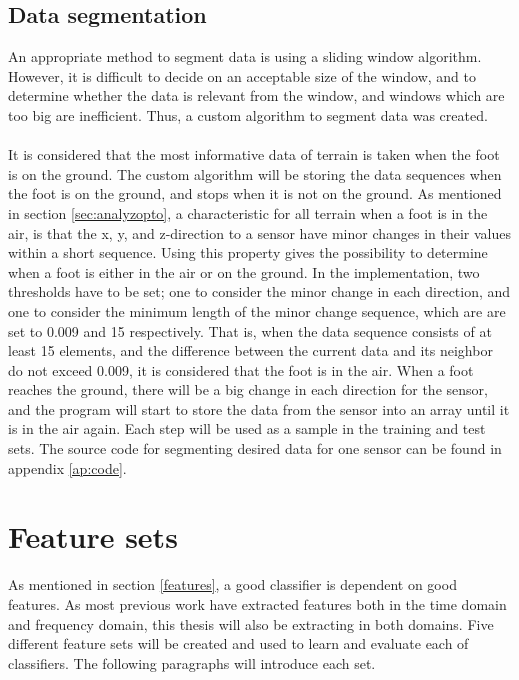 \documentclass[USenglish]{ifimaster}  %
\begin{document}
\subsection{Data segmentation} \label{subseq:segmentation}
An appropriate method to segment data is using a sliding window algorithm. However, it is difficult to decide on an acceptable size of the window, and to determine whether the data is relevant from the window, and windows which are too big are inefficient. Thus, a custom algorithm to segment data was created. 
\\
\\
It is considered that the most informative data of terrain is taken when the foot is on the ground. The custom algorithm will be storing the data sequences when the foot is on the ground, and stops when it is not on the ground. As mentioned in section \ref{sec:analyzopto}, a characteristic for all terrain when a foot is in the air, is that the x, y, and z-direction to a sensor have minor changes in their values within a short sequence. Using this property gives the possibility to determine when a foot is either in the air or on the ground. In the implementation, two thresholds have to be set; one to consider the minor change in each direction, and one to consider the minimum length of the minor change sequence, which are are set to 0.009 and 15 respectively. That is, when the data sequence consists of at least 15 elements, and the difference between the current data and its neighbor do not exceed 0.009, it is considered that the foot is in the air. When a foot reaches the ground, there will be a big change in each direction for the sensor, and the program will start to store the data from the sensor into an array until it is in the air again. Each step will be used as a sample in the training and test sets. The source code for segmenting desired data for one sensor can be found in appendix \ref{ap:code}.

\section{Feature sets}\label{sec:featuresets}
As mentioned in section \ref{features}, a good classifier is dependent on good features. As most previous work have extracted features both in the time domain and frequency domain, this thesis will also be extracting in both domains. Five different feature sets will be created and used to learn and evaluate each of classifiers. The following paragraphs will introduce each set.
\end{document}

